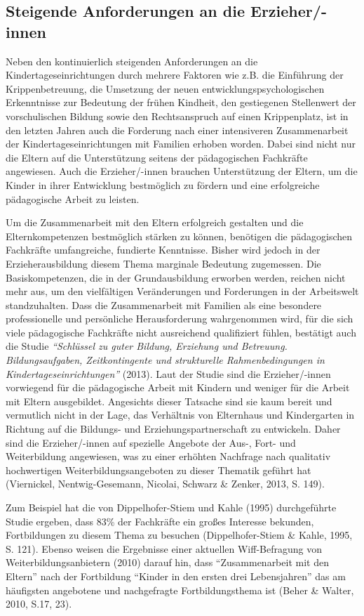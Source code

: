 \documentclass[12pt,a4paper]{article}
\begin{document}
\subsection{Steigende Anforderungen an die Erzieher/-innen}
Neben den kontinuierlich steigenden Anforderungen an die Kindertageseinrichtungen durch mehrere Faktoren wie z.B. die Einführung der Krippenbetreuung, die Umsetzung der neuen entwicklungspsychologischen Erkenntnisse zur Bedeutung der frühen Kindheit, den gestiegenen Stellenwert der vorschulischen Bildung sowie den Rechtsanspruch auf einen Krippenplatz, ist in den letzten Jahren auch die Forderung nach einer intensiveren Zusammenarbeit der Kindertageseinrichtungen mit Familien erhoben worden. Dabei sind nicht nur die Eltern auf die Unterstützung seitens der pädagogischen Fachkräfte angewiesen. Auch die Erzieher/-innen brauchen Unterstützung der Eltern, um die Kinder in ihrer Entwicklung bestmöglich zu fördern und eine erfolgreiche pädagogische Arbeit zu leisten.

Um die Zusammenarbeit mit den Eltern erfolgreich gestalten und die Elternkompetenzen bestmöglich stärken zu können, benötigen die pädagogischen Fachkräfte umfangreiche, fundierte Kenntnisse. Bisher wird jedoch in der Erzieherausbildung diesem Thema marginale Bedeutung zugemessen. Die Basiskompetenzen, die in der Grundausbildung erworben werden, reichen nicht mehr aus, um den vielfältigen Veränderungen und Forderungen in der Arbeitswelt standzuhalten. Dass die Zusammenarbeit mit Familien als eine besondere professionelle und persönliche Herausforderung wahrgenommen wird, für die sich viele pädagogische Fachkräfte nicht ausreichend qualifiziert fühlen, bestätigt auch die Studie \textit{"`Schlüssel zu guter Bildung, Erziehung und Betreuung. Bildungsaufgaben, Zeitkontingente und strukturelle Rahmenbedingungen in Kindertageseinrichtungen"'} (2013). Laut der Studie sind die Erzieher/-innen vorwiegend für die pädagogische Arbeit mit Kindern und weniger für die Arbeit mit Eltern ausgebildet. Angesichts dieser Tatsache sind sie kaum bereit und vermutlich nicht in der Lage, das Verhältnis von Elternhaus und Kindergarten in Richtung auf die Bildungs- und Erziehungspartnerschaft zu entwickeln. Daher sind die Erzieher/-innen auf spezielle Angebote der Aus-, Fort- und Weiterbildung angewiesen, was zu einer erhöhten Nachfrage nach qualitativ hochwertigen Weiterbildungsangeboten zu dieser Thematik geführt hat (Viernickel, Nentwig-Gesemann, Nicolai, Schwarz \& Zenker, 2013, S. 149).

Zum Beispiel hat die von Dippelhofer-Stiem und Kahle (1995) durchgeführte Studie ergeben, dass 83\% der Fachkräfte ein großes Interesse bekunden, Fortbildungen zu diesem Thema zu besuchen (Dippelhofer-Stiem \& Kahle, 1995, S. 121). Ebenso weisen die Ergebnisse einer aktuellen Wiff-Befragung von Weiterbildungsanbietern (2010) darauf hin, dass "`Zusammenarbeit mit den Eltern"' nach der Fortbildung "`Kinder in den ersten drei Lebensjahren"' das am häufigsten angebotene und nachgefragte Fortbildungsthema ist (Beher \& Walter, 2010, S.17, 23).
\end{document}
